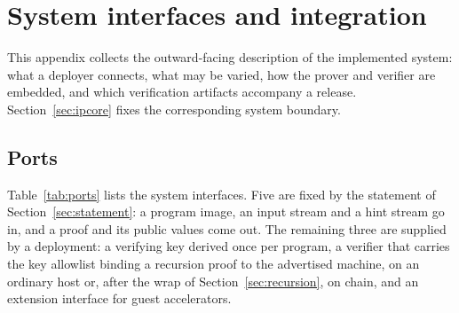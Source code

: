 \section{System interfaces and integration}
\label{sec:app-ipcore}

This appendix collects the outward-facing description of the implemented system: what a deployer connects, what may be varied, how the prover and verifier are embedded, and which verification artifacts accompany a release. Section~\ref{sec:ipcore} fixes the corresponding system boundary.

\subsection{Ports}
\label{sec:ipcore-ports}

Table~\ref{tab:ports} lists the system interfaces. Five are fixed by the statement of Section~\ref{sec:statement}: a program image, an input stream and a hint stream go in, and a proof and its public values come out. The remaining three are supplied by a deployment: a verifying key derived once per program, a verifier that carries the key allowlist binding a recursion proof to the advertised machine, on an ordinary host or, after the wrap of Section~\ref{sec:recursion}, on chain, and an extension interface for guest accelerators.

